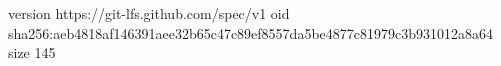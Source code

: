 version https://git-lfs.github.com/spec/v1
oid sha256:aeb4818af146391aee32b65c47c89ef8557da5be4877c81979c3b931012a8a64
size 145
